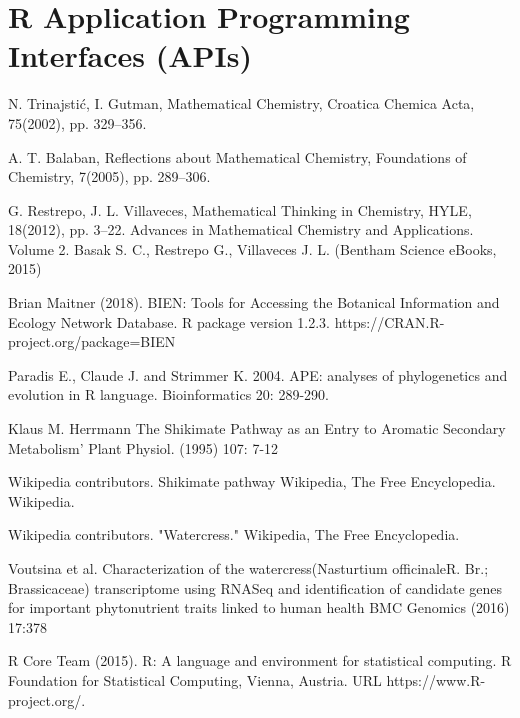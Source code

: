 \section{R Application Programming Interfaces (APIs)}





\begin{thebibliography}{00}

N. Trinajstić, I. Gutman, 
\newblock Mathematical Chemistry, 
\newblock Croatica Chemica Acta, 75(2002), pp. 329–356.

A. T. Balaban, 
\newblock Reflections about Mathematical Chemistry, 
\newblock Foundations of Chemistry, 7(2005), pp. 289–306.

G. Restrepo, J. L. Villaveces, 
\newblock Mathematical Thinking in Chemistry, HYLE, 18(2012), pp. 3–22.
\newblock Advances in Mathematical Chemistry and Applications. Volume 2. Basak S. C., Restrepo G., Villaveces J. L. (Bentham Science eBooks, 2015)

Brian Maitner (2018). 
\newblock BIEN: Tools for Accessing the Botanical Information and Ecology
\newblock Network Database. R package version 1.2.3. https://CRAN.R-project.org/package=BIEN

 Paradis E., Claude J. and Strimmer K. 2004. 
\newblock APE: analyses of phylogenetics and evolution in R language. 
\newblock Bioinformatics 20: 289-290.

 Klaus M. Herrmann 
\newblock The Shikimate Pathway as an  Entry to Aromatic Secondary Metabolism' 
\newblock Plant Physiol. (1995) 107: 7-12

 Wikipedia contributors. 
\newblock Shikimate pathway 
\newblock Wikipedia, The Free Encyclopedia. Wikipedia. 

Wikipedia contributors. 
\newblock "Watercress." 
\newblock Wikipedia, The Free Encyclopedia. 

 Voutsina et al.
\newblock Characterization of the watercress(Nasturtium officinaleR. Br.; Brassicaceae) transcriptome using RNASeq and
identification of candidate genes for important phytonutrient traits linked to human health
\newblock BMC Genomics (2016) 17:378 

R Core Team (2015). 
\newblock R: A language and environment for statistical computing. R Foundation for Statistical Computing, Vienna, Austria.
\newblock URL https://www.R-project.org/.

\end{thebibliography}

